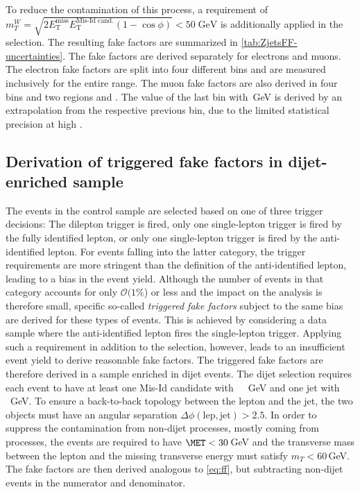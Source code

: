 To reduce the contamination of this process, a requirement of $m_T^W = \sqrt{2E^{\textrm{miss}}_\textrm{T} E^{\text{Mis-Id cand.}}_\textrm{T} (1-\cos\phi)} < 50\;\textrm{GeV}$ is additionally applied in the \Zjets selection.
The resulting fake factors are summarized in \cref{tab:ZjetsFF-uncertainties}.
The fake factors are derived separately for electrons and muons. The electron fake factors are split into four different \pT bins and are measured inclusively for the entire \abseta range.
The muon fake factors are also derived in four \pT bins and two \abseta regions  and . The value of the last \pT bin with \,GeV is derived by an extrapolation from the respective previous bin, due to the limited statistical precision at high \pT.

\subsection{Derivation of triggered fake factors in dijet-enriched sample}
The events in the control sample are selected based on one of three trigger decisions: The dilepton trigger is fired, only one single-lepton trigger is fired by the fully identified lepton, or only one single-lepton trigger is fired by the anti-identified lepton.
For events falling into the latter category, the trigger requirements are more stringent than the definition of the anti-identified lepton, leading to a bias in the event yield.
Although the number of events in that category accounts for only $\mathcal{O}(1\%$) or less and the impact on the analysis is therefore small, specific so-called \emph{triggered fake factors} subject to the same bias are derived for these types of events. This is achieved by considering a data sample where the anti-identified lepton fires the single-lepton trigger.
    Applying such a requirement in addition to the \Zjets selection, however, leads to an insufficient event yield to derive reasonable fake factors. The triggered fake factors are therefore derived in a sample enriched in dijet events.
    The dijet selection requires each event to have at least one Mis-Id candidate with ~\,~GeV and one jet with ~\,~GeV. To ensure a back-to-back topology between the lepton and the jet, the two objects must have an angular separation $\Delta \phi(\text{lep}, \text{jet}) > 2.5$.
    In order to suppress the contamination from non-dijet processes, mostly coming from \Wjets processes, the events are required to have $\MET < 30$\,GeV and the transverse mass between the lepton and the missing transverse energy must satisfy $m_T < 60\,$GeV.
    The fake factors are then derived analogous to \cref{eq:ff}, but subtracting non-dijet events in the numerator and denominator.


